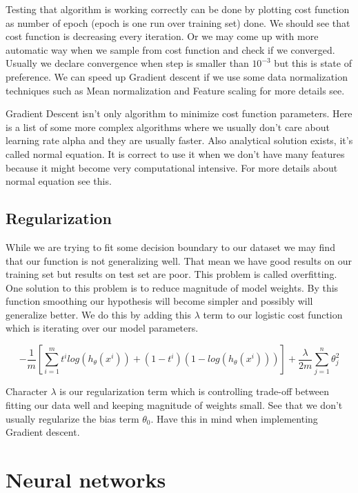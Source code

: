Testing that algorithm is working correctly can be done by plotting cost function  as number of epoch (epoch is one run over training set) done. We should see that cost function is decreasing every iteration. Or we may come up with more automatic way when we sample from cost function and check if we converged. Usually we declare convergence when step is smaller than \(10^{-3}\) but this is state of preference.  We can speed up Gradient descent if we use some data normalization techniques such as Mean normalization and Feature scaling for more details see.

Gradient Descent isn't only algorithm to minimize cost function parameters. Here is a list of some more complex algorithms where we usually don't care about learning rate alpha and they are usually faster. Also analytical solution exists, it's called normal equation. It is correct to use it when we don't have many features because it might become very computational intensive. For more details about normal equation see this.

\section{Regularization}
While we are trying to fit some decision boundary to our dataset we may find that our function is not generalizing well. That mean we have good results on our training set but results on test set are poor. This problem is called overfitting. One solution to this problem is to reduce magnitude of model weights. By this function smoothing our hypothesis will become simpler and possibly will generalize better. We do this by adding this \(\lambda\) term to our logistic cost function which is iterating over our model parameters.

\begin{equation}
-\frac{1}{m}[\sum\limits_{i=1}^m t^i log(h_\theta(x^i)) + (1-t^i) (1 - log(h_\theta(x^i)))] + \frac{\lambda}{2m}\sum\limits_{j=1}^n \theta_j^2 
\end{equation}

Character \(\lambda\) is our regularization term which is controlling trade-off between fitting our data well and keeping magnitude of weights small. See that we don't usually regularize the bias term \(\theta_0\). Have this in mind when implementing Gradient descent.

\chapter{Neural networks}
